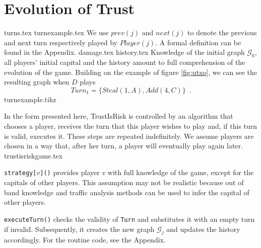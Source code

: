 \section{Evolution of Trust}
  {turns.tex}
  {turnexample.tex}
  We use $prev\left(j\right)$ and $next\left(j\right)$ to denote the previous and next turn respectively played by
  $Player(j)$. A formal definition can be found in the Appendix.
  {damage.tex}
  {history.tex}
  Knowledge of the initial graph $\mathcal{G}_0$, all players' initial capital and the history amount to full comprehension of
  the evolution of the game. Building on the example of figure \ref{fig:utxo}, we can see the resulting graph when $D$ plays
  \begin{equation}
  \label{turnexample}
    Turn_1 = \{Steal\left(1, A\right), Add\left(4, C\right)\} \enspace.
  \end{equation}
  {turnexample.tikz}

  In the form presented here, TrustIsRisk is controlled by an algorithm that chooses a player, receives the turn that
  this player wishes to play and, if this turn is valid, executes it. These steps are repeated indefinitely. We assume
  players are chosen in a way that, after her turn, a player will eventually play again later.
  {trustisriskgame.tex}

  \texttt{strategy[}$v$\texttt{]()} provides player $v$ with full knowledge of the game, except for the capitals of other
  players. This assumption may not be realistic because out of band knowledge and traffic analysis methods can be used to
  infer the capital of other players.

  \texttt{executeTurn()} checks the validity of \texttt{Turn} and substitutes it with an empty turn if invalid.
  Subsequently, it creates the new graph $\mathcal{G}_j$ and updates the history accordingly. For the routine code,
  see the Appendix.

